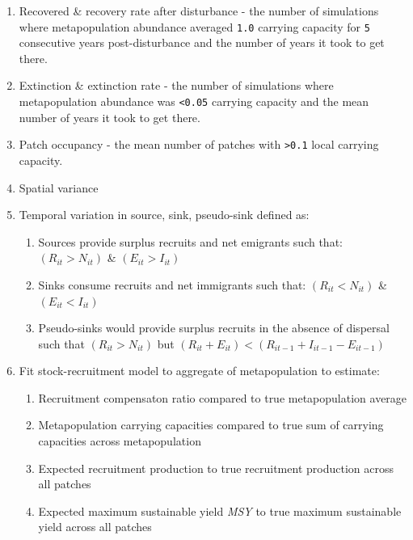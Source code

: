 \documentclass[]{article}
\providecommand{\tightlist}{%
  \setlength{\itemsep}{0pt}\setlength{\parskip}{0pt}}
\begin{document}
\begin{enumerate}
\def\labelenumi{\arabic{enumi}.}
\item
  Recovered \& recovery rate after disturbance - the number of
  simulations where metapopulation abundance averaged \texttt{1.0}
  carrying capacity for \texttt{5} consecutive years post-disturbance
  and the number of years it took to get there.
\item
  Extinction \& extinction rate - the number of simulations where
  metapopulation abundance was \texttt{\textless{}0.05} carrying
  capacity and the mean number of years it took to get there.
\item
  Patch occupancy - the mean number of patches with
  \texttt{\textgreater{}0.1} local carrying capacity.
\item
  Spatial variance
\item
  Temporal variation in source, sink, pseudo-sink defined as:

  \begin{enumerate}
  \def\labelenumii{\alph{enumii}.}
  \tightlist
  \item
    Sources provide surplus recruits and net emigrants such that:
    \((R_{it}>N_{it})\) \& \((E_{it}>I_{it})\)
  \item
    Sinks consume recruits and net immigrants such that:
    \((R_{it} < N_{it})\) \& \((E_{it} < I_{it})\)
  \item
    Pseudo-sinks would provide surplus recruits in the absence of
    dispersal such that \((R_{it}>N_{it})\) but
    \((R_{it}+E_{it}) < (R_{it-1}+I_{it-1}-E_{it-1})\)
  \end{enumerate}
\item
  Fit stock-recruitment model to aggregate of metapopulation to
  estimate:

  \begin{enumerate}
  \def\labelenumii{\alph{enumii}.}
  \tightlist
  \item
    Recruitment compensaton ratio compared to true metapopulation
    average
  \item
    Metapopulation carrying capacities compared to true sum of carrying
    capacities across metapopulation
  \item
    Expected recruitment production to true recruitment production
    across all patches
  \item
    Expected maximum sustainable yield \emph{MSY} to true maximum
    sustainable yield across all patches
  \end{enumerate}
\end{enumerate}
\end{document}
